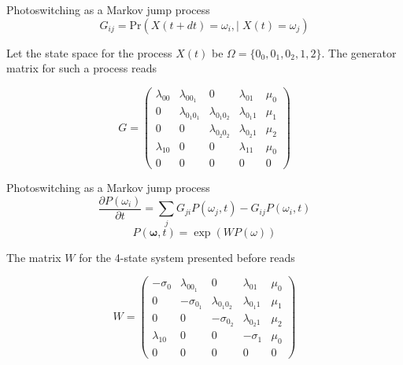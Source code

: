 \documentclass[aspectratio=169]{beamer}
\begin{document}
\begin{frame}{Photoswitching as a Markov jump process}
\begin{equation*}
G_{ij} = \mathrm{Pr}\left(X(t+dt)=\omega_{i}, | \;X(t)=\omega_{j}\right)
\end{equation*}

Let the state space for the process $X(t)$ be $\Omega = \{0_{0},0_{1},0_{2},1,2\}$. The generator matrix for such a process reads

\begin{equation*}
G = 
\begin{pmatrix}
\lambda_{00} & \lambda_{0 0_{1}} & 0 & \lambda_{01} & \mu_{0}\\
0 & \lambda_{0_{1}0_{1}} & \lambda_{0_{1}0_{2}} & \lambda_{0_{1}1} & \mu_{1}\\
0 & 0 & \lambda_{0_{2}0_{2}} & \lambda_{0_{2}1} & \mu_{2}\\
\lambda_{10} & 0 & 0 & \lambda_{11} & \mu_{0}\\
0 & 0 & 0 & 0 & 0
\end{pmatrix}
\end{equation*}
\end{frame}

\begin{frame}{Photoswitching as a Markov jump process}
\begin{equation*}
\frac{\partial P(\omega_{i})}{\partial t} = \sum_{j}G_{ji}P(\omega_{j},t) - G_{ij}P(\omega_{i},t)
\end{equation*}
\begin{equation*}
P(\bm{\omega}, t) = \exp(W P(\omega))
\end{equation*}

The matrix $W$ for the 4-state system presented before reads

\begin{equation*}
W = 
\begin{pmatrix}
-\sigma_{0} & \lambda_{0 0_{1}} & 0 & \lambda_{01} & \mu_{0}\\
0 & -\sigma_{0_{1}} & \lambda_{0_{1}0_{2}} & \lambda_{0_{1}1} & \mu_{1}\\
0 & 0 & -\sigma_{0_{2}} & \lambda_{0_{2}1} & \mu_{2}\\
\lambda_{10} & 0 & 0 & -\sigma_{1} & \mu_{0}\\
0 & 0 & 0 & 0 & 0
\end{pmatrix}
\end{equation*}

\end{frame}
\end{document}
